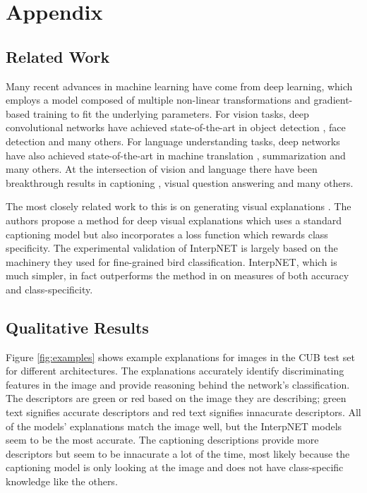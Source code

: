 \documentclass{article}
\begin{document}
\small

{}


\section{Appendix}

\subsection{Related Work}
Many recent advances in machine learning have come from deep learning, which employs a model composed of multiple non-linear transformations and gradient-based training to fit the underlying parameters. For vision tasks, deep convolutional networks have achieved state-of-the-art in object detection \cite{russakovsky2015imagenet}, face detection \cite{rowley1998neural} and many others. For language understanding tasks, deep networks have also achieved state-of-the-art in machine translation \cite{bahdanau2014neural}, summarization \cite{rush2015neural} and many others. At the intersection of vision and language there have been breakthrough results in captioning \cite{showandtell2014}, visual question answering \cite{antol2015vqa} and many others. 

The most closely related work to this is on generating visual explanations \cite{hendricks2016generating}. The authors propose a method for deep visual explanations which uses a standard captioning model but also incorporates a loss function which rewards class specificity. The experimental validation of InterpNET is largely based on the machinery they used for fine-grained bird classification. InterpNET, which is much simpler, in fact outperforms the method in \cite{hendricks2016generating} on measures of both accuracy and class-specificity.

\subsection{Qualitative Results}

Figure \ref{fig:examples} shows example explanations for images in the CUB test set for different architectures. The explanations accurately identify discriminating features in the image and provide reasoning behind the network's classification. The descriptors are green or red based on the image they are describing; green text signifies accurate descriptors and red text signifies innacurate descriptors. All of the models' explanations match the image well, but the InterpNET models seem to be the most accurate. The captioning descriptions provide more descriptors but seem to be innacurate a lot of the time, most likely because the captioning model is only looking at the image and does not have class-specific knowledge like the others.
\end{document}

